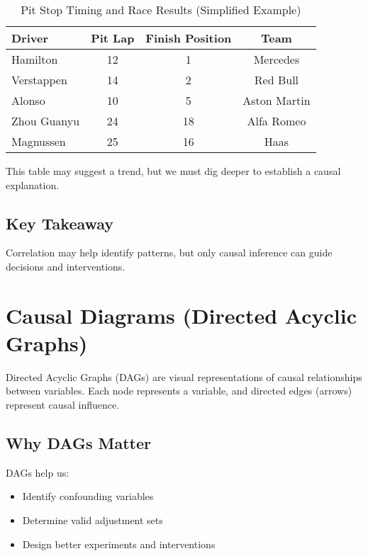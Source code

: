 \documentclass[12pt]{book}
\begin{document}
\begin{table}[H]
\centering
\caption{Pit Stop Timing and Race Results (Simplified Example)}
\begin{tabular}{@{}lccc@{}}
\toprule
\textbf{Driver} & \textbf{Pit Lap} & \textbf{Finish Position} & \textbf{Team} \\ \midrule
Hamilton       & 12              & 1                         & Mercedes       \\
Verstappen     & 14              & 2                         & Red Bull       \\
Alonso         & 10              & 5                         & Aston Martin   \\
Zhou Guanyu    & 24              & 18                        & Alfa Romeo     \\
Magnussen      & 25              & 16                        & Haas           \\
\bottomrule
\end{tabular}
\end{table}

This table may suggest a trend, but we must dig deeper to establish a causal explanation.

\subsection*{Key Takeaway}

Correlation may help identify patterns, but only causal inference can guide decisions and interventions.

\section{Causal Diagrams (Directed Acyclic Graphs)}

Directed Acyclic Graphs (DAGs) are visual representations of causal relationships between variables. Each node represents a variable, and directed edges (arrows) represent causal influence.

\subsection*{Why DAGs Matter}

DAGs help us:
\begin{itemize}
    \item Identify confounding variables
    \item Determine valid adjustment sets
    \item Design better experiments and interventions
\end{itemize}
\end{document}
